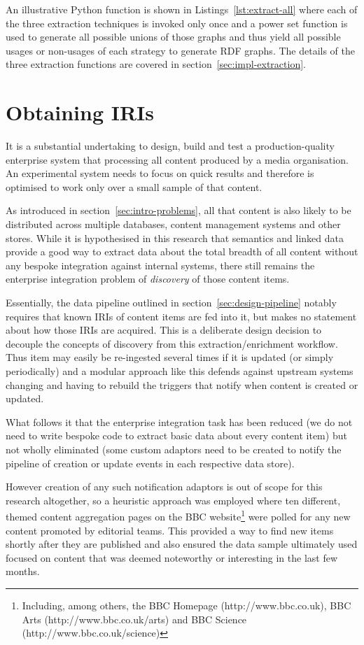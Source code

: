An illustrative Python function is shown in
Listings~\ref{lst:extract-all} where each of the three extraction
techniques is invoked only once and a power set function is used to
generate all possible unions of those graphs and thus yield all
possible usages or non-usages of each strategy to generate RDF
graphs. The details of the three extraction functions are covered in
section~\ref{sec:impl-extraction}.

\section{Obtaining IRIs}

It is a substantial undertaking to design, build and test a
production-quality enterprise system that processing all content
produced by a media organisation. An experimental system needs to
focus on quick results and therefore is optimised to work only over
a small sample of that content.

As introduced in section~\ref{sec:intro-problems}, all that content is
also likely to be distributed across multiple databases, content
management systems and other stores. While it is hypothesised in
this research that semantics and linked data provide a good way to
extract data about the total breadth of all content without any
bespoke integration against internal systems, there still remains
the enterprise integration problem of \emph{discovery} of those
content items.

Essentially, the data pipeline outlined in
section~\ref{sec:design-pipeline} notably requires that known IRIs of
content items are fed into it, but makes no statement about how those
IRIs are acquired. This is a deliberate design decision to decouple
the concepts of discovery from this extraction/enrichment workflow.
Thus item may easily be re-ingested several times if it is updated
(or simply periodically) and
a modular approach like this defends against upstream systems changing
and having to rebuild the triggers that notify when content is created
or updated.

What follows it that the enterprise integration task has been reduced
(we do not need to write bespoke code to extract basic data about
every content item) but not wholly eliminated (some custom adaptors
need to be created to notify the pipeline of creation or update events
in each respective data store).

However creation of any such notification adaptors is out of scope
for this research altogether, so a heuristic approach was employed
where ten different, themed content aggregation pages on the BBC
website\footnote{
  Including, among others, the BBC Homepage (http://www.bbc.co.uk),
  BBC Arts (http://www.bbc.co.uk/arts) and BBC Science
  (http://www.bbc.co.uk/science)
} were polled for any new content promoted by editorial teams.
This provided a way to find new items shortly after they are published
and also ensured the data sample ultimately used focused on content
that was deemed noteworthy or interesting in the last few months.


